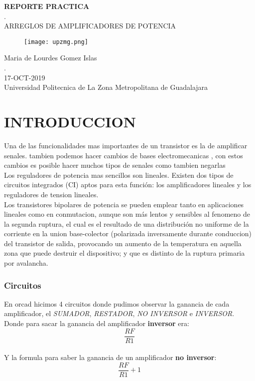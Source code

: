 \documentclass[11pt,a4paper]{article}
\begin{document}
\begin{center}
\textbf{REPORTE PRACTICA}\\
.\\
ARREGLOS DE AMPLIFICADORES DE POTENCIA
\end{center}

\begin{figure}[h]
\centering
\texttt{[image: upzmg.png]} 
\end{figure}

\begin{center}
Maria de Lourdes Gomez Islas\\
.\\
17-OCT-2019\\
Universidad Politecnica de La Zona Metropolitana de Guadalajara
\end{center}


\newpage

\part{INTRODUCCION}
Una de las funcionalidades mas importantes de un transistor es la de amplificar senales. tambien podemos hacer cambios de bases electromecanicas , con estos cambios es posible hacer muchos tipos de senales como tambien negarlas\\
Los reguladores de potencia mas sencillos son lineales. Existen dos tipos de circuitos integrados (CI) aptos para esta función: los amplificadores lineales y los reguladores de tension lineales.\\
Los transistores bipolares de potencia se pueden emplear tanto en aplicaciones lineales como en conmutacion, aunque son más lentos y sensibles al fenomeno de la segunda ruptura, el cual es el resultado de una distribución no uniforme de la corriente en la union base-colector (polarizada inversamente durante conduccion) del transistor de salida, provocando un aumento de la temperatura en aquella zona que puede destruir el dispositivo; y que es distinto de la ruptura primaria por avalancha.

\section{Circuitos}
En orcad hicimos 4 circuitos donde pudimos observar la ganancia de cada amplificador, el \emph{SUMADOR}, \emph{RESTADOR}, \emph{NO INVERSOR} e \emph{INVERSOR}.
Donde para sacar la ganancia del amplificador \textbf{inversor} era:\\
 $$ \frac{RF}{R1} $$\\
Y la formula para saber la ganancia de un amplificador \textbf{no inversor}:\\
$$ \frac{RF}{R1} + 1 $$\\
\end{document}
